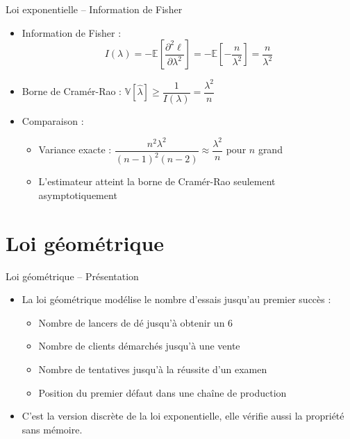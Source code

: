 \documentclass[11pt,aspectratio=169]{beamer}
\begin{document}
\begin{frame}{Loi exponentielle -- Information de Fisher}

\begin{itemize}

\item Information de Fisher :
  \[
  I(\lambda) = -\mathbb{E}\left[\frac{\partial^2 \ell}{\partial \lambda^2}\right] = -\mathbb{E}\left[-\frac{n}{\lambda^2}\right] = \frac{n}{\lambda^2}
  \]

\item Borne de Cramér-Rao : $\mathbb{V}[\hat{\lambda}] \geq \dfrac{1}{I(\lambda)} = \dfrac{\lambda^2}{n}$\newline

\item Comparaison :
  \begin{itemize}
    \item Variance exacte : $\dfrac{n^2 \lambda^2}{(n-1)^2(n-2)} \approx \dfrac{\lambda^2}{n}$ pour $n$ grand\newline
    \item L'estimateur atteint la borne de Cramér-Rao seulement asymptotiquement
  \end{itemize}

\end{itemize}

\end{frame}

\section{Loi géométrique}

\begin{frame}{Loi géométrique -- Présentation}

\begin{itemize}

\item La loi géométrique modélise le nombre d'essais jusqu'au premier succès :\newline
  \begin{itemize}
    \item Nombre de lancers de dé jusqu'à obtenir un 6\newline
    \item Nombre de clients démarchés jusqu'à une vente\newline
    \item Nombre de tentatives jusqu'à la réussite d'un examen\newline
    \item Position du premier défaut dans une chaîne de production\newline
  \end{itemize}

\item C'est la version discrète de la loi exponentielle, elle vérifie aussi la propriété sans mémoire.

\end{itemize}

\end{frame}
\end{document}
